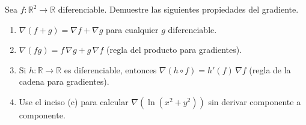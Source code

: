 Sea $f: \mathbb{R}^2 \to \mathbb{R}$ diferenciable. Demuestre las siguientes propiedades del gradiente.
\begin{enumerate}
    \item $\nabla(f + g) = \nabla f + \nabla g$ para cualquier $g$ diferenciable.
    \item $\nabla(fg) = f\,\nabla g + g\,\nabla f$ (regla del producto para gradientes).
    \item Si $h: \mathbb{R} \to \mathbb{R}$ es diferenciable, entonces $\nabla(h \circ f) = h'(f)\,\nabla f$ (regla de la cadena para gradientes).
    \item Use el inciso (c) para calcular $\nabla\!\left(\ln(x^2 + y^2)\right)$ sin derivar componente a componente.
\end{enumerate}
